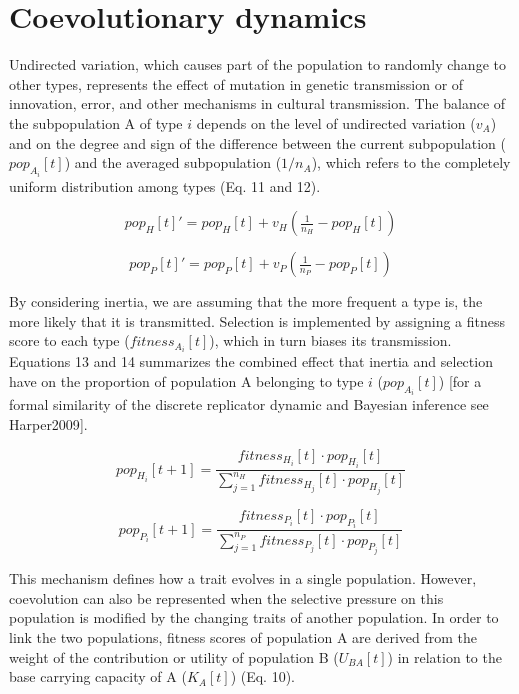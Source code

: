 \documentclass[
]{book}
\begin{document}
\hypertarget{coevolutionary-dynamics}{%
\section*{Coevolutionary dynamics}\label{coevolutionary-dynamics}}

Undirected variation, which causes part of the population to randomly change to other types, represents the effect of mutation in genetic transmission or of innovation, error, and other mechanisms in cultural transmission. The balance of the subpopulation A of type \(i\) depends on the level of undirected variation (\(v_{A}\)) and on the degree and sign of the difference between the current subpopulation (\(pop_{A_{i}}[t]\)) and the averaged subpopulation (\(1/n_{A}\)), which refers to the completely uniform distribution among types (Eq. 11 and 12).

\begin{equation}
\tag{Eq. 11}
pop_{H}[t]'=pop_{H}[t]+v_{H}\left(\tfrac{1}{n_{H}}-pop_{H}[t]\right)
\end{equation}

\begin{equation}
\tag{Eq. 12}
pop_{P}[t]'=pop_{P}[t]+v_{P}\left(\tfrac{1}{n_{P}}-pop_{P}[t]\right)
\end{equation}

By considering inertia, we are assuming that the more frequent a type is, the more likely that it is transmitted. Selection is implemented by assigning a fitness score to each type (\(fitness_{A_{i}}[t]\)), which in turn biases its transmission. Equations 13 and 14 summarizes the combined effect that inertia and selection have on the proportion of population A belonging to type \(i\) (\(pop_{A_{i}}[t]\)) {[}for a formal similarity of the discrete replicator dynamic and Bayesian inference see Harper2009{]}.

\begin{equation}
\tag{Eq. 13}
pop_{H_{i}}[t+1]=\frac{fitness_{H_{i}}[t]\cdot pop_{H_{i}}[t]}{\sum_{j=1}^{n_{H}}fitness_{H_{j}}[t]\cdot pop_{H_{j}}[t]}
\end{equation}

\begin{equation}
\tag{Eq. 14}
pop_{P_{i}}[t+1]=\frac{fitness_{P_{i}}[t]\cdot pop_{P_{i}}[t]}{\sum_{j=1}^{n_{P}}fitness_{P_{j}}[t]\cdot pop_{P_{j}}[t]}
\end{equation}

This mechanism defines how a trait evolves in a single population. However, coevolution can also be represented when the selective pressure on this population is modified by the changing traits of another population. In order to link the two populations, fitness scores of population A are derived from the weight of the contribution or utility of population B (\(U_{BA}[t]\)) in relation to the base carrying capacity of A (\(K_{A}[t]\)) (Eq. 10).
\end{document}
